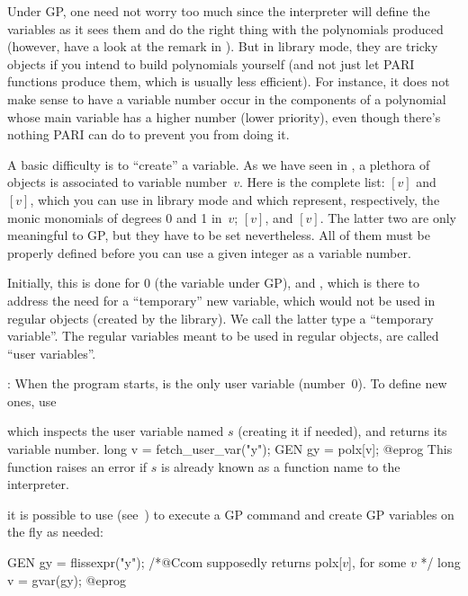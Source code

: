 Under GP, one need not worry too much since the interpreter will define
the variables as it sees them and do the right thing with the polynomials
produced (however, have a look at the remark in ). But
in library mode, they are tricky objects if you intend to build polynomials
yourself (and not just let PARI functions produce them, which is usually less
efficient). For instance, it does not make sense to have a variable number
occur in the components of a polynomial whose main variable has a higher
number (lower priority), even though there's nothing PARI can do to prevent
you from doing it.

A basic difficulty is to ``create'' a variable. As we have seen in
, a plethora of objects is associated to variable
number~$v$. Here is the complete list: $[v]$ and
$[v]$, which you can use in library mode and which represent,
respectively, the monic monomials of degrees 0 and 1 in~$v$;
$[v]$, and $[v]$. The latter two are only
meaningful to GP, but they have to be set nevertheless. All of them must be
properly defined before you can use a given integer as a variable number.

Initially, this is done for $0$ (the variable  under GP), and
, which is there to address the need for a ``temporary'' new
variable, which would not be used in regular objects (created by the
library). We call the latter type a ``temporary variable''. The regular
variables meant to be used in regular objects, are called ``user
variables''.

:
When the program starts,  is the only user variable (number~$0$). To
define new ones, use


\noindent which inspects the user variable named $s$ (creating it if
needed), and returns its variable number. 
\bprog
long v = fetch_user_var("y");
GEN gy = polx[v];
@eprog
This function raises an error if $s$ is already known as a function name to
the interpreter.

 it is possible to use 
(see~) to execute a GP command and create GP variables
on the fly as needed:

\bprog
GEN gy = flissexpr("y"); /*@Ccom supposedly returns polx[$v$], for some $v$ */
long v = gvar(gy);
@eprog


